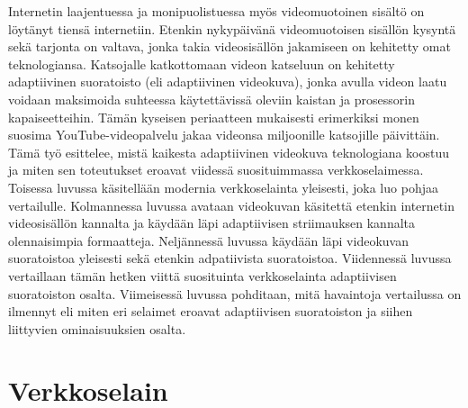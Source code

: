 \documentclass[finnish, 12pt, a4paper, elec, utf8, a-1b, online]{aaltothesis}
\begin{document}
  \noindent Internetin laajentuessa ja monipuolistuessa myös videomuotoinen sisältö on löytänyt tiensä internetiin. Etenkin nykypäivänä videomuotoisen sisällön kysyntä sekä tarjonta on valtava, jonka takia videosisällön jakamiseen on kehitetty omat teknologiansa. Katsojalle katkottomaan videon katseluun on kehitetty adaptiivinen suoratoisto (eli adaptiivinen videokuva), jonka avulla videon laatu voidaan maksimoida suhteessa käytettävissä oleviin kaistan ja prosessorin kapaiseetteihin. Tämän kyseisen periaatteen mukaisesti erimerkiksi monen suosima YouTube-videopalvelu jakaa videonsa miljoonille katsojille päivittäin. \\

  \noindent Tämä työ esittelee, mistä kaikesta adaptiivinen videokuva teknologiana koostuu ja miten sen toteutukset eroavat viidessä suosituimmassa verkkoselaimessa. Toisessa luvussa käsitellään modernia verkkoselainta yleisesti, joka luo pohjaa vertailulle. Kolmannessa luvussa avataan videokuvan käsitettä etenkin internetin videosisällön kannalta ja käydään läpi adaptiivisen striimauksen kannalta olennaisimpia formaatteja. Neljännessä luvussa käydään läpi videokuvan suoratoistoa yleisesti sekä etenkin adpatiivista suoratoistoa. Viidennessä luvussa vertaillaan tämän hetken viittä suosituinta verkkoselainta adaptiivisen suoratoiston osalta. Viimeisessä luvussa pohditaan, mitä havaintoja vertailussa on ilmennyt eli miten eri selaimet eroavat adaptiivisen suoratoiston ja siihen liittyvien ominaisuuksien osalta.

\clearpage



\section{Verkkoselain}
\end{document}
